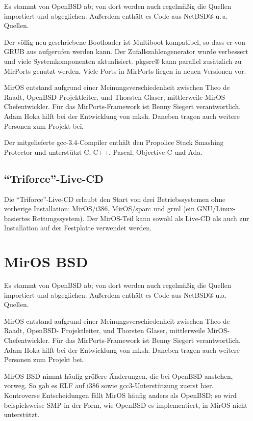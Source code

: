 \documentclass[a4paper,landscape,11pt,notumble]{leaflet}
\begin{document}
Es stammt von OpenBSD ab; von dort werden auch regelmäßig die Quellen importiert und abgeglichen. Außerdem enthält es Code aus NetBSD® u.\,a. Quellen.

Der völlig neu geschriebene Bootloader ist Multiboot-kompatibel, so dass er von GRUB aus aufgerufen werden kann. Der Zufallszahlengenerator wurde verbessert und viele Systemkomponenten aktualisiert. pkgsrc® kann parallel zusätzlich zu MirPorts genutzt werden. Viele Ports in MirPorts liegen in neuen Versionen vor.

MirOS entstand aufgrund einer Meinungsverschiedenheit zwischen Theo de Raadt, OpenBSD-Projektleiter, und Thorsten Glaser, mittlerweile MirOS-Chefentwickler. Für das MirPorts-Framework ist Benny Siegert verantwortlich. Adam Hoka hilft bei der Entwicklung von mksh. Daneben tragen auch weitere Personen zum Projekt bei.

Der mitgelieferte gcc-3.4-Compiler enthält den Propolice Stack Smashing Protector und unterstützt C, C++, Pascal, Objective-C und Ada.

\subsection{"`Triforce"'-Live-CD}

Die "`Triforce"'-Live-CD erlaubt den Start von drei Betriebssystemen ohne vorherige Installation: MirOS/i386, MirOS/sparc und grml (ein GNU/Linux-basiertes Rettungssystem). Der MirOS-Teil kann sowohl als Live-CD als auch zur Installation auf der Festplatte verwendet werden.

\newpage

\section{MirOS BSD}


Es stammt von OpenBSD ab; von dort werden auch regelmäßig die Quellen importiert und abgeglichen. Außerdem enthält es Code aus NetBSD® u.a. Quellen.

MirOS entstand aufgrund einer Meinungsverschiedenheit zwischen Theo de Raadt, OpenBSD- Projektleiter, und Thorsten Glaser, mittlerweile MirOS-Chefentwickler. Für das MirPorts-Framework ist Benny Siegert verantwortlich. Adam Hoka hilft bei der Entwicklung von mksh. Daneben tragen auch weitere Personen zum Projekt bei.

MirOS BSD nimmt häufig größere Änderungen, die bei OpenBSD anstehen, vorweg. So gab es ELF auf i386 sowie gcc3-Unterstützung zuerst hier. Kontroverse Entscheidungen fällt MirOS häufig anders als OpenBSD; so wird beispielsweise SMP in der Form, wie OpenBSD es implementiert, in MirOS nicht unterstützt.
\end{document}
